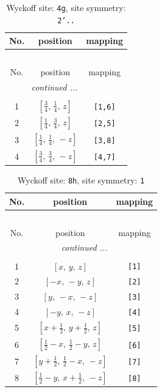 \documentclass[fleqn,8pt]{jsarticle}
\begin{document}
\renewcommand{\arraystretch}{1.2}
\begin{longtable}{ccc}
\caption{Wyckoff site: {\tt 4g}, site symmetry: {\tt 2'..}}
 \\
 \hline \hline
No. & position & mapping \\ \hline \endfirsthead

\multicolumn{2}{l}{\tablename\ \thetable{}} \\
 \hline \hline
No. & position & mapping \\ \hline \endhead

 \hline \hline
\multicolumn{2}{r}{\footnotesize\it continued ...} \\ \endfoot

 \hline \hline
\multicolumn{2}{r}{} \\ \endlastfoot

1 & $\left[ \frac{3}{4},\, \frac{1}{4},\, z \right]$ & {\tt [1,6]} \\ \hline
2 & $\left[ \frac{1}{4},\, \frac{3}{4},\, z \right]$ & {\tt [2,5]} \\ \hline
3 & $\left[ \frac{1}{4},\, \frac{1}{4},\, - z \right]$ & {\tt [3,8]} \\ \hline
4 & $\left[ \frac{3}{4},\, \frac{3}{4},\, - z \right]$ & {\tt [4,7]} \\
\end{longtable}
\renewcommand{\arraystretch}{1.2}
\begin{longtable}{ccc}
\caption{Wyckoff site: {\tt 8h}, site symmetry: {\tt 1}}
 \\
 \hline \hline
No. & position & mapping \\ \hline \endfirsthead

\multicolumn{2}{l}{\tablename\ \thetable{}} \\
 \hline \hline
No. & position & mapping \\ \hline \endhead

 \hline \hline
\multicolumn{2}{r}{\footnotesize\it continued ...} \\ \endfoot

 \hline \hline
\multicolumn{2}{r}{} \\ \endlastfoot

1 & $\left[ x,\, y,\, z \right]$ & {\tt [1]} \\ \hline
2 & $\left[ - x,\, - y,\, z \right]$ & {\tt [2]} \\ \hline
3 & $\left[ y,\, - x,\, - z \right]$ & {\tt [3]} \\ \hline
4 & $\left[ - y,\, x,\, - z \right]$ & {\tt [4]} \\ \hline
5 & $\left[ x + \frac{1}{2},\, y + \frac{1}{2},\, z \right]$ & {\tt [5]} \\ \hline
6 & $\left[ \frac{1}{2} - x,\, \frac{1}{2} - y,\, z \right]$ & {\tt [6]} \\ \hline
7 & $\left[ y + \frac{1}{2},\, \frac{1}{2} - x,\, - z \right]$ & {\tt [7]} \\ \hline
8 & $\left[ \frac{1}{2} - y,\, x + \frac{1}{2},\, - z \right]$ & {\tt [8]} \\
\end{longtable}
\end{document}
